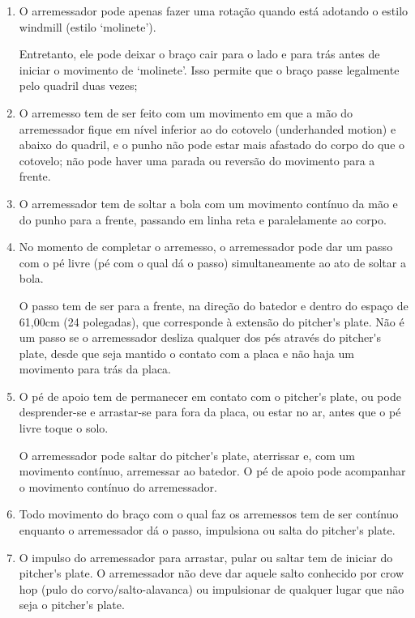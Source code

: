 \begin{multicols}{2}
\begin{enumerate}[label=\alph*)]
		\item O arremessador pode apenas fazer uma rota\c{c}\~ao quando est\'a adotando o estilo \gls{windmill} (estilo ‘molinete'). 
		
		Entretanto, ele pode deixar o bra\c{c}o cair para o lado e para tr\'as antes de iniciar o movimento de ‘molinete'. Isso permite que o bra\c{c}o passe legalmente pelo quadril duas vezes; 
		
		\item  O arremesso tem de ser feito com um movimento em que a m\~ao do arremessador fique em n\'ivel inferior ao do cotovelo (\gls{underhanded motion}) e abaixo do quadril, e o punho n\~ao pode estar mais afastado do corpo do que o cotovelo; n\~ao pode haver uma parada ou revers\~ao do movimento para a frente. 
		
		\item  O arremessador tem de soltar a bola com um movimento cont\'inuo da m\~ao e do punho para a frente, passando em linha reta e paralelamente ao corpo. 
		
		\item  No momento de completar o arremesso, o arremessador pode dar um passo com o p\'e livre (p\'e com o qual d\'a o passo) simultaneamente ao ato de soltar a bola. 
		
		O passo tem de ser para a frente, na dire\c{c}\~ao do batedor e dentro do espa\c{c}o de 61,00cm (24 polegadas), que corresponde \`a extens\~ao do \gls{pitcher's plate}. N\~ao \'e um passo se o arremessador desliza qualquer dos p\'es atrav\'es do \gls{pitcher's plate}, desde que seja mantido o contato com a placa e n\~ao haja um movimento para tr\'as da placa. 
		
		\item  O p\'e de apoio tem de permanecer em contato com o \gls{pitcher's plate}, ou pode desprender-se e arrastar-se para fora da placa, ou estar no ar, antes que o p\'e livre toque o solo. 
		
		O arremessador pode saltar do \gls{pitcher's plate}, aterrissar e, com um movimento cont\'inuo, arremessar ao batedor. O p\'e de apoio pode acompanhar o movimento cont\'inuo do arremessador. 
		
		\item  Todo movimento do bra\c{c}o com o qual faz os arremessos tem de ser cont\'inuo enquanto o arremessador d\'a o passo, impulsiona ou salta do \gls{pitcher's plate}. 
		
		\item  O impulso do arremessador para arrastar, pular ou saltar tem de iniciar do \gls{pitcher's plate}. O arremessador n\~ao deve dar aquele salto conhecido por \gls{crow hop} (pulo do corvo/salto-alavanca) ou impulsionar de qualquer lugar que n\~ao seja o \gls{pitcher's plate}. 
		

\end{enumerate}
\end{multicols}
